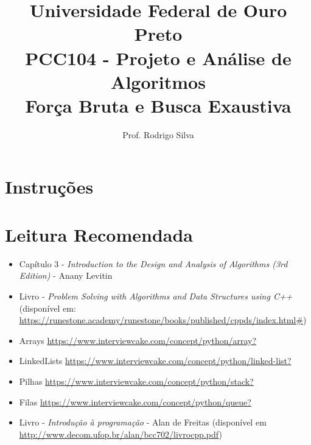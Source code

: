 \documentclass{article}
\title{\vspace{-2 cm}Universidade Federal de Ouro Preto \\ PCC104 - Projeto e Análise de Algoritmos \\ Força Bruta e Busca Exaustiva}
\author{Prof. Rodrigo Silva}
\begin{document}
\maketitle

\section*{Instruções}




\section{Leitura Recomendada}

\begin{itemize}
    \item Capítulo 3 - \textit{Introduction to the Design and Analysis of Algorithms (3rd Edition)} - Anany Levitin 
    \item Livro - \textit{Problem Solving with Algorithms and Data Structures using C++} (disponível em: \url{https://runestone.academy/runestone/books/published/cppds/index.html#})
    \item Arrays \url{https://www.interviewcake.com/concept/python/array?}
    \item LinkedLists \url{https://www.interviewcake.com/concept/python/linked-list?}
    \item Pilhas \url{https://www.interviewcake.com/concept/python/stack?}
    \item Filas \url{https://www.interviewcake.com/concept/python/queue?}
    \item Livro - \textit{Introdução à programação} - Alan de Freitas (disponível em \url{http://www.decom.ufop.br/alan/bcc702/livrocpp.pdf})
\end{itemize}
\end{document}
